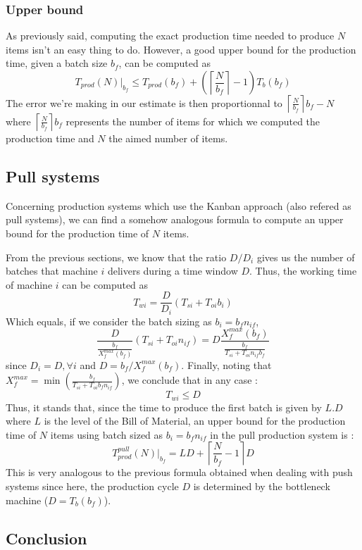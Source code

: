 \subsubsection{Upper bound}

As previously said, computing the exact production time needed to produce $N$ items isn't an easy thing to do. However, a good upper bound for the production time, given a batch size $b_f$, can be computed as \[ T_{prod}(N)|_{b_f}\le T_{prod}(b_f) + \left( \left\lceil \frac{N}{b_f} \right\rceil - 1 \right)T_b(b_f) \] The error we're making in our estimate is then proportionnal to $\left\lceil \frac{N}{b_f} \right\rceil b_f - N$ where $\left\lceil \frac{N}{b_f} \right\rceil b_f$ represents the number of items for which we computed the production time and $N$ the aimed number of items. 

\subsection{Pull systems}

Concerning production systems which use the Kanban approach (also refered as pull systems), we can find a somehow analogous formula to compute an upper bound for the production time of $N$ items.

From the previous sections, we know that the ratio $D/D_i$ gives us the number of batches that machine $i$ delivers during a time window $D$. Thus, the working time of machine $i$ can be computed as \[ T_{wi} = \frac{D}{D_i}(T_{si}+T_{oi}b_i) \] Which equals, if we consider the batch sizing as $b_i = b_f n_{if}$, \[ \frac{D}{\frac{b_f}{X_f^{max}(b_f)}} (T_{si} + T_{oi}n_{if}) = D\frac{X_f^{max}(b_f)}{\frac{b_f}{T_{si}+T_{oi}n_{if}b_f}} \] since $D_i = D, \forall i$ and $D = b_f / X^{max}_f(b_f)$. Finally, noting that $X_f^{max} = \min\left( \frac{b_f}{T_{si} + T_{oi}b_fn_{if}} \right)$, we conclude that in any case : \[ T_{wi} \le D \] Thus, it stands that, since the time to produce the first batch is given by $L.D$ where $L$ is the level of the Bill of Material, an upper bound for the production time of $N$ items using batch sized as $b_i = b_fn_{if}$ in the pull production system is :
\[
    T_{prod}^{pull}(N)|_{b_f} = LD + \left\lceil \frac{N}{b_f} - 1 \right\rceil D
\]
This is very analogous to the previous formula obtained when dealing with push systems since here, the production cycle $D$ is determined by the bottleneck machine ($D = T_b(b_f)$). 

\subsection{Conclusion}

